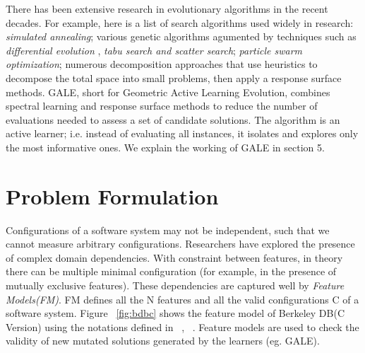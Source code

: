\documentclass{sig-alternative}
\begin{document}
    There has been extensive research in evolutionary algorithms in the recent decades. For example, here is a list of search algorithms used widely in research: \textit{simulated annealing}\cite{bell2013limited, menzies2007business}; various genetic algorithms\cite{goldberg1979complexity} agumented by techniques such as \textit{differential evolution} \cite{storn1997differential}, \textit{tabu search and scatter search}\cite{nebro2008abyss, molina2007sspmo, glover1986general, beausoleil2006moss}; \textit{particle swarm optimization}\cite{pan2008particle}; numerous decomposition approaches that use heuristics to decompose the total space into small problems, then apply a response surface methods\cite{krall2014gale, zuluaga2013active}. GALE, short for Geometric Active Learning Evolution,
combines spectral learning and response surface methods
to reduce the number of evaluations needed to assess a set
of candidate solutions. The algorithm is an active learner;
i.e. instead of evaluating all instances, it isolates and explores
only the most informative ones. We explain the working of GALE in section 5.


\section{Problem Formulation}


    Configurations of a software system may not be independent, such that we cannot measure arbitrary configurations. Researchers have explored the presence of complex domain dependencies. With constraint between features, in theory there can be multiple minimal configuration (for example, in the presence of mutually exclusive features). These dependencies are captured well by \textit{Feature Models(FM)}. FM defines all the N features and all the valid configurations C of a software system. Figure ~\ref{fig:bdbc}  shows the feature model of Berkeley DB(C Version) using the notations defined in ~\cite{kang1990feature}, ~\cite{guo2012consistency}. Feature models are used to check the validity of new mutated solutions generated by the learners (eg. GALE).
    
\end{document}
